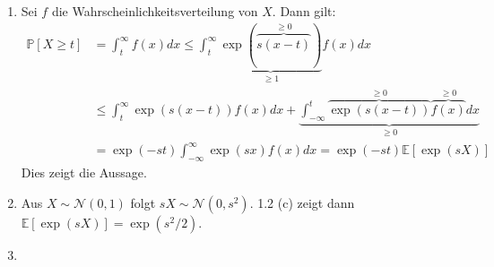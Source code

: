 \documentclass{article}
\begin{document}
\begin{enumerate}[label=(\alph*)]
	\item Sei $f$ die Wahrscheinlichkeitsverteilung von $X$. Dann gilt:
	      \begin{align*}
		      \mathds{P}[X \geq t] & = \int_{t}^{\infty} f(x) dx \leq \int_{t}^{\infty} \underbrace{\exp(\overbrace{s(x-t)}^{\geq 0})}_{\geq 1} f(x) dx                                    \\
		                           & \leq \int_{t}^{\infty} \exp(s(x-t)) f(x) dx + \underbrace{\int_{-\infty}^{t} \overbrace{\exp(s(x-t))}^{\geq 0} \overbrace{f(x)}^{\geq 0} dx}_{\geq 0} \\
		                           & = \exp(-st) \int_{-\infty}^{\infty} \exp(sx) f(x) dx = \exp(-st) \mathds{E}[\exp(sX)]
	      \end{align*}
	      Dies zeigt die Aussage.
	\item Aus $X \sim \mathcal{N}(0,1)$ folgt $sX \sim \mathcal{N}(0,s^2)$. 1.2 (c) zeigt dann $\mathds{E}[\exp(sX)] = \exp(s^2/2)$.
	\item
\end{enumerate}

\subsection{}
\end{document}
